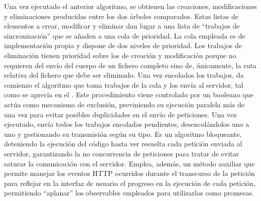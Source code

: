 Una vez ejecutado el anterior algoritmo, se obtienen las creaciones, modificaciones y eliminaciones producidas entre los dos árboles comparados. Estas listas de elementos a crear, modificar y eliminar dan lugar a una lista de ``trabajos de sincronización'' que se añaden a una cola de prioridad. La cola empleada es de implementación propia y dispone de dos niveles de prioridad. Los trabajos de eliminación tienen prioridad sobre los de creación y modificación porque no requieren del envío del cuerpo de un fichero completo sino de, únicamente, la ruta relativa del fichero que debe ser eliminado. Una vez encolados los trabajos, da comienzo el algoritmo que toma trabajos de la cola y los envía al servidor, tal como se aprecia en el . Este procedimiento viene controlado por un booleano que actúa como mecanismo de exclusión, previniendo su ejecución paralela más de una vez para evitar posibles duplicidades en el envío de peticiones. Una vez ejecutado, envía todos los trabajos encolados pendientes, desencolándolos uno a uno y gestionando su transmisión según su tipo. Es un algoritmo bloqueante, deteniendo la ejecución del código hasta ver resuelta cada petición enviada al servidor, garantizando la no concurrencia de peticiones para tratar de evitar saturar la comunicación con el servidor. Emplea, además, un método auxiliar que permite manejar los eventos HTTP ocurridos durante el transcurso de la petición para reflejar en la interfaz de usuario el progreso en la ejecución de cada petición, permitiendo ``aplanar'' los observables empleados para utilizarlos como promesas.

